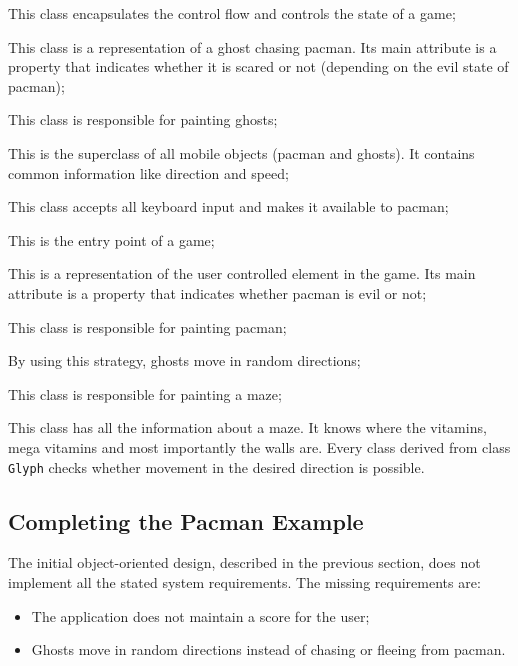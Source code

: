 \begin{description}[noitemsep,style=nextline]
  \item [Game] This class encapsulates the control flow and controls the state of a game;
  \item [Ghost] This class is a representation of a ghost chasing pacman.
    Its main attribute is a property that indicates whether it is scared or not (depending on the evil state of pacman);
  \item [GhostView] This class is responsible for painting ghosts;
  \item [Glyph] This is the superclass of all mobile objects (pacman and ghosts).
    It contains common information like direction and speed;
  \item [Keyboard] This class accepts all keyboard input and makes it available to pacman;
  \item [Main] This is the entry point of a game;
  \item [Pacman] This is a representation of the user controlled element in the game.
    Its main attribute is a property that indicates whether pacman is evil or not;
  \item [PacmanView] This class is responsible for painting pacman;
  \item [RandomStrategy] By using this strategy, ghosts move in random directions;
  \item [View] This class is responsible for painting a maze;
  \item [World] This class has all the information about a maze.
    It knows where the vitamins, mega vitamins and most importantly the walls are.
    Every class derived from class \lstinline|Glyph| checks whether movement in the desired direction is possible.
\end{description}

\subsection{Completing the Pacman Example}
The initial object-oriented design, described in the previous section, does not implement all the stated system requirements.
The missing requirements are:

\begin{itemize}[noitemsep]
  \samepage
  \item The application does not maintain a score for the user;
  \item Ghosts move in random directions instead of chasing or fleeing from pacman.
\end{itemize}

